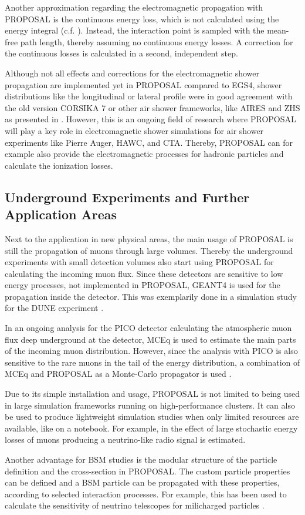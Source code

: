 Another approximation regarding the electromagnetic propagation with PROPOSAL is the continuous energy loss, which is not calculated using the energy integral (c.f. ).
Instead, the interaction point is sampled with the mean-free path length, thereby assuming no continuous energy losses.
A correction for the continuous losses is calculated in a second, independent step.

Although not all effects and corrections for the electromagnetic shower propagation are implemented yet in PROPOSAL compared to EGS4, shower distributions like the longitudinal or lateral profile were in good agreement with the old version CORSIKA 7 or other air shower frameworks, like AIRES and ZHS as presented in \cite{Alameddine21ICRC}.
However, this is an ongoing field of research where PROPOSAL will play a key role in electromagnetic shower simulations for air shower experiments like Pierre Auger, HAWC, and CTA.
Thereby, PROPOSAL can for example also provide the electromagnetic processes for hadronic particles and calculate the ionization losses.

%

\subsection{Underground Experiments and Further Application Areas}

Next to the application in new physical areas, the main usage of PROPOSAL is still the propagation of muons through large volumes.
Thereby the underground experiments with small detection volumes also start using PROPOSAL for calculating the incoming muon flux.
Since these detectors are sensitive to low energy processes, not implemented in PROPOSAL, GEANT4 is used for the propagation inside the detector.
This was exemplarily done in a simulation study for the DUNE experiment \cite{Schneider21DUNE}.

In an ongoing analysis for the PICO detector calculating the atmospheric muon flux deep underground at the detector, MCEq is used to estimate the main parts of the incoming muon distribution.
However, since the analysis with PICO is also sensitive to the rare muons in the tail of the energy distribution, a combination of MCEq and PROPOSAL as a Monte-Carlo propagator is used \cite{Fedynitch21PICO}.

Due to its simple installation and usage, PROPOSAL is not limited to being used in large simulation frameworks running on high-performance clusters.
It can also be used to produce lightweight simulation studies when only limited resources are available, like on a notebook.
For example, in \cite{GarciaFernandez2020RNOG} the effect of large stochastic energy losses of muons producing a neutrino-like radio signal is estimated.

Another advantage for BSM studies is the modular structure of the particle definition and the cross-section in PROPOSAL.
The custom particle properties can be defined and a BSM particle can be propagated with these properties, according to selected interaction processes.
For example, this has been used to calculate the sensitivity of neutrino telescopes for milicharged particles \cite{Arguelles21MiliCharged}.
